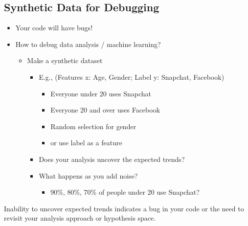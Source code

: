 \documentclass[11pt]{article}
\theoremstyle{definition}
\begin{document}
\subsection{Synthetic Data for Debugging}
\begin{itemize}
    \item Your code will have bugs!
    \item How to debug data analysis / machine learning?
    \begin{itemize}
        \item Make a synthetic dataset
        \begin{itemize}
            \item E.g., (Features x: Age, Gender; Label y: {Snapchat, Facebook})
            \begin{itemize}
                \item Everyone under 20 uses Snapchat
                \item Everyone 20 and over uses Facebook
                \item Random selection for gender
                \item or use label as a feature
            \end{itemize}
            \item Does your analysis uncover the expected trends?
            \item What happens as you add noise?
            \begin{itemize}
                \item 90\%, 80\%, 70\% of people under 20 use Snapchat?
            \end{itemize}
        \end{itemize}
    \end{itemize}
\end{itemize}

Inability to uncover expected trends indicates a bug in your code
or the need to revisit your analysis approach or hypothesis space.
\end{document}
